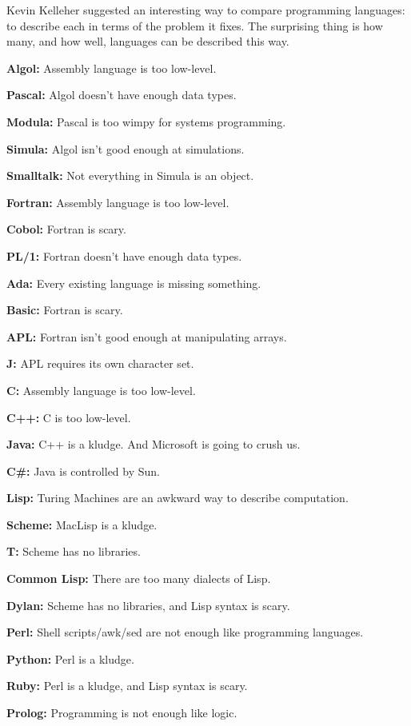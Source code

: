 Kevin Kelleher suggested an interesting way to compare programming
languages: to describe each in terms of the problem it fixes. The
surprising thing is how many, and how well, languages can be described
this way.

\textbf{Algol:} Assembly language is too low-level.

\textbf{Pascal:} Algol doesn't have enough data types.

\textbf{Modula:} Pascal is too wimpy for systems programming.

\textbf{Simula:} Algol isn't good enough at simulations.

\textbf{Smalltalk:} Not everything in Simula is an object.

\textbf{Fortran:} Assembly language is too low-level.

\textbf{Cobol:} Fortran is scary.

\textbf{PL/1:} Fortran doesn't have enough data types.

\textbf{Ada:} Every existing language is missing something.

\textbf{Basic:} Fortran is scary.

\textbf{APL:} Fortran isn't good enough at manipulating arrays.

\textbf{J:} APL requires its own character set.

\textbf{C:} Assembly language is too low-level.

\textbf{C++:} C is too low-level.

\textbf{Java:} C++ is a kludge. And Microsoft is going to crush us.

\textbf{C\#:} Java is controlled by Sun.

\textbf{Lisp:} Turing Machines are an awkward way to describe
computation.

\textbf{Scheme:} MacLisp is a kludge.

\textbf{T:} Scheme has no libraries.

\textbf{Common Lisp:} There are too many dialects of Lisp.

\textbf{Dylan:} Scheme has no libraries, and Lisp syntax is scary.

\textbf{Perl:} Shell scripts/awk/sed are not enough like programming
languages.

\textbf{Python:} Perl is a kludge.

\textbf{Ruby:} Perl is a kludge, and Lisp syntax is scary.

\textbf{Prolog:} Programming is not enough like logic.
